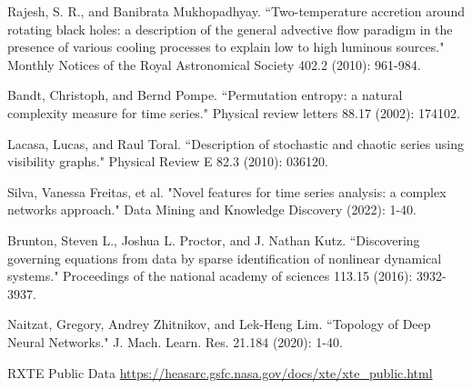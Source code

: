 \documentclass[journal]{IEEEtran}
\begin{document}
\begin{thebibliography}{1}
Rajesh, S. R., and Banibrata Mukhopadhyay. ``Two-temperature accretion around rotating black holes: a description of the general advective flow paradigm in the presence of various cooling processes to explain low to high luminous sources." Monthly Notices of the Royal Astronomical Society 402.2 (2010): 961-984.



Bandt, Christoph, and Bernd Pompe. ``Permutation entropy: a natural complexity measure for time series." Physical review letters 88.17 (2002): 174102.


Lacasa, Lucas, and Raul Toral. ``Description of stochastic and chaotic series using visibility graphs." Physical Review E 82.3 (2010): 036120.

Silva, Vanessa Freitas, et al. "Novel features for time series analysis: a complex networks approach." Data Mining and Knowledge Discovery (2022): 1-40.

Brunton, Steven L., Joshua L. Proctor, and J. Nathan Kutz. ``Discovering governing equations from data by sparse identification of nonlinear dynamical systems." Proceedings of the national academy of sciences 113.15 (2016): 3932-3937.

Naitzat, Gregory, Andrey Zhitnikov, and Lek-Heng Lim. ``Topology of Deep Neural Networks." J. Mach. Learn. Res. 21.184 (2020): 1-40.

RXTE Public Data \url{https://heasarc.gsfc.nasa.gov/docs/xte/xte_public.html}

\end{thebibliography}

	
\end{document}
